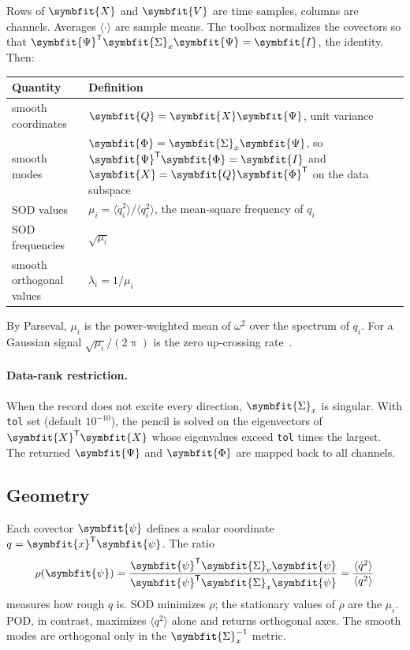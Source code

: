 \documentclass[report]{nld}
\newcommand{\X}{{\symbfit{X}}}
\newcommand{\V}{{\symbfit{V}}}
\newcommand{\Q}{{\symbfit{Q}}}
\newcommand{\x}{{\symbfit{x}}}
\newcommand{\Sg}{{\symbfit{\Sigma}}}
\newcommand{\Ps}{{\symbfit{\Psi}}}
\newcommand{\Ph}{{\symbfit{\Phi}}}
\newcommand{\psib}{{\symbfit{\psi}}}
\newcommand{\avg}[1]{\langle #1\rangle}
\newcommand{\code}[1]{\texttt{#1}}
\begin{document}
Rows of $\X$ and $\V$ are time samples, columns are channels. Averages
$\avg{\cdot}$ are sample means. The toolbox normalizes the covectors so that
$\Ps^{\mathsf T}\Sg_x\Ps={\symbfit{I}}$, the identity. Then:
\begin{center}\small
\begin{tabular}{@{}ll@{}}
\toprule
Quantity & Definition\\
\midrule
smooth coordinates & $\Q=\X\Ps$, unit variance\\
smooth modes & $\Ph=\Sg_x\Ps$, so $\Ps^{\mathsf T}\Ph={\symbfit{I}}$ and $\X=\Q\Ph^{\mathsf T}$ on the data subspace\\
SOD values & $\mu_i=\avg{\dot q_i^2}/\avg{q_i^2}$, the mean-square frequency of $q_i$\\
SOD frequencies & $\sqrt{\mu_i}$\\
smooth orthogonal values & $\lambda_i=1/\mu_i$\\
\bottomrule
\end{tabular}
\end{center}
By Parseval, $\mu_i$ is the power-weighted mean of $\omega^2$ over the spectrum of
$q_i$. For a Gaussian signal $\sqrt{\mu_i}/(2\uppi)$ is the zero up-crossing
rate~\cite{Rice1944}.

\paragraph{Data-rank restriction.} When the record does not excite every
direction, $\Sg_x$ is singular. With \code{tol} set (default $10^{-10}$), the
pencil is solved on the eigenvectors of $\X^{\mathsf T}\X$ whose eigenvalues exceed
\code{tol} times the largest. The returned $\Ps$ and $\Ph$ are mapped back to all
channels.

\subsection{Geometry}\label{sec:geometry}

Each covector $\psib$ defines a scalar coordinate $q=\x^{\mathsf T}\psib$. The ratio
\begin{equation}
  \rho(\psib)=\frac{\psib^{\mathsf T}\Sg_v\psib}{\psib^{\mathsf T}\Sg_x\psib}=\frac{\avg{\dot q^2}}{\avg{q^2}}
\end{equation}
measures how rough $q$ is. SOD minimizes $\rho$; the stationary values of $\rho$
are the $\mu_i$. POD, in contrast, maximizes $\avg{q^2}$ alone and returns
orthogonal axes. The smooth modes are orthogonal only in the $\Sg_x^{-1}$ metric.
\end{document}
